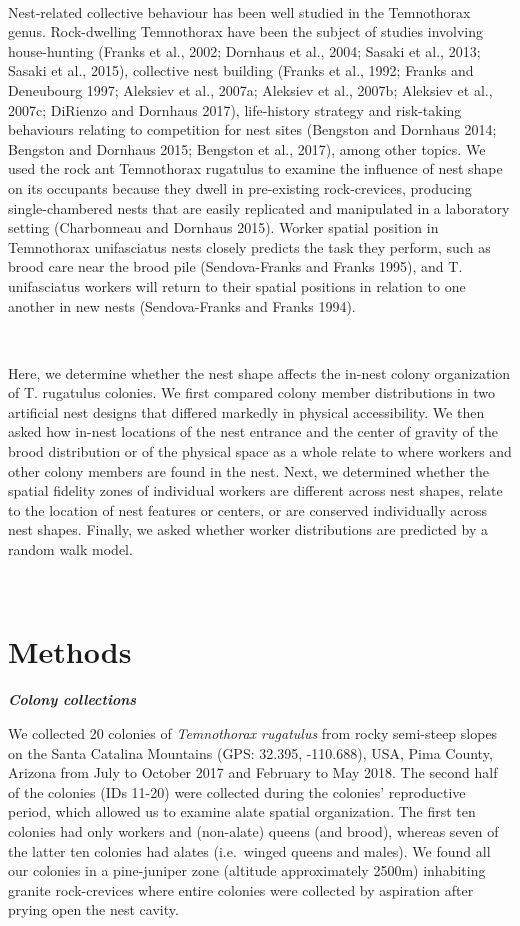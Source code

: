 \documentclass[3p]{elsarticle} %
\begin{document}
~

Nest-related collective behaviour has been well studied in the
Temnothorax genus. Rock-dwelling Temnothorax have been the subject of
studies involving house-hunting (Franks et al., 2002; Dornhaus et al.,
2004; Sasaki et al., 2013; Sasaki et al., 2015), collective nest
building (Franks et al., 1992; Franks and Deneubourg 1997; Aleksiev et
al., 2007a; Aleksiev et al., 2007b; Aleksiev et al., 2007c; DiRienzo and
Dornhaus 2017), life-history strategy and risk-taking behaviours
relating to competition for nest sites (Bengston and Dornhaus 2014;
Bengston and Dornhaus 2015; Bengston et al., 2017), among other topics.
We used the rock ant Temnothorax rugatulus to examine the influence of
nest shape on its occupants because they dwell in pre-existing
rock-crevices, producing single-chambered nests that are easily
replicated and manipulated in a laboratory setting (Charbonneau and
Dornhaus 2015). Worker spatial position in Temnothorax unifasciatus
nests closely predicts the task they perform, such as brood care near
the brood pile (Sendova-Franks and Franks 1995), and T. unifasciatus
workers will return to their spatial positions in relation to one
another in new nests (Sendova-Franks and Franks 1994).

~

Here, we determine whether the nest shape affects the in-nest colony
organization of T. rugatulus colonies. We first compared colony member
distributions in two artificial nest designs that differed markedly in
physical accessibility. We then asked how in-nest locations of the nest
entrance and the center of gravity of the brood distribution or of the
physical space as a whole relate to where workers and other colony
members are found in the nest. Next, we determined whether the spatial
fidelity zones of individual workers are different across nest shapes,
relate to the location of nest features or centers, or are conserved
individually across nest shapes. Finally, we asked whether worker
distributions are predicted by a random walk model.

~

\hypertarget{methods}{%
\section{Methods}\label{methods}}

\textbf{\emph{Colony collections}}

We collected 20 colonies of \emph{Temnothorax rugatulus} from rocky
semi-steep slopes on the Santa Catalina Mountains (GPS: 32.395,
-110.688), USA, Pima County, Arizona from July to October 2017 and
February to May 2018. The second half of the colonies (IDs 11-20) were
collected during the colonies' reproductive period, which allowed us to
examine alate spatial organization. The first ten colonies had only
workers and (non-alate) queens (and brood), whereas seven of the latter
ten colonies had alates (i.e.~winged queens and males). We found all our
colonies in a pine-juniper zone (altitude approximately 2500m)
inhabiting granite rock-crevices where entire colonies were collected by
aspiration after prying open the nest cavity.
\end{document}
